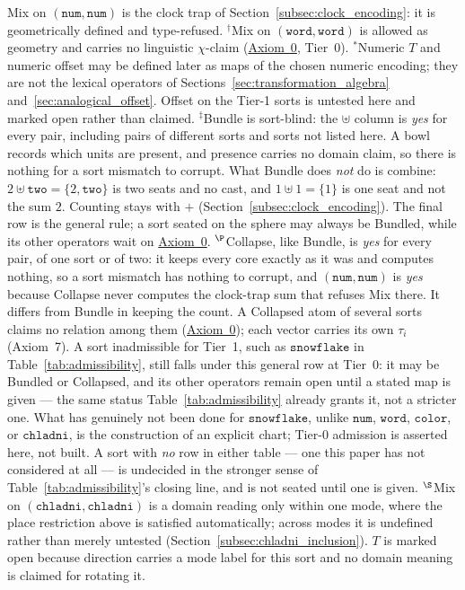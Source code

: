 \documentclass[12pt, a4paper]{article}
\begin{document}
\begin{table}[h]
{Mix on $(\mathtt{num},\mathtt{num})$ is the clock trap of
Section~\ref{subsec:clock_encoding}: it is geometrically defined and
type-refused. $^{\dagger}$Mix on $(\mathtt{word},\mathtt{word})$ is
allowed as geometry and carries no linguistic $\chi$-claim
(\hyperref[subsec:axiom0_admissibility]{Axiom~0}, Tier~0).
$^{*}$Numeric $T$ and numeric offset may be defined later as
maps of the chosen numeric encoding; they are not the lexical
operators of Sections~\ref{sec:transformation_algebra}
and~\ref{sec:analogical_offset}. Offset on the Tier-1 sorts is
untested here and marked open rather than claimed.
$^{\ddagger}$Bundle is sort-blind: the $\uplus$ column is \emph{yes}
for every pair, including pairs of different sorts and sorts not
listed here. A bowl records which units are present, and presence
carries no domain claim, so there is nothing for a sort mismatch to
corrupt. What Bundle does \emph{not} do is combine: $2\uplus
\texttt{two}=\{2,\texttt{two}\}$ is two seats and no cast, and
$1\uplus 1=\{1\}$ is one seat and not the sum $2$. Counting stays with
$+$ (Section~\ref{subsec:clock_encoding}). The final row is the
general rule; a sort seated on the sphere may always be Bundled, while
its other operators wait on
\hyperref[subsec:axiom0_admissibility]{Axiom~0}.
$^{\P}$Collapse, like Bundle, is \emph{yes} for every pair, of one sort or of two: it keeps every core exactly as it was and computes nothing, so a sort mismatch has nothing to corrupt, and $(\mathtt{num},\mathtt{num})$ is \emph{yes} because Collapse never computes the clock-trap sum that refuses Mix there. It differs from Bundle in keeping the count. A Collapsed atom of several sorts claims no relation among them (\hyperref[subsec:axiom0_admissibility]{Axiom~0}); each vector carries its own $\tau_i$ (Axiom~7). A sort inadmissible for
Tier~1, such as $\mathtt{snowflake}$ in
Table~\ref{tab:admissibility}, still falls under this general row at
Tier~0: it may be Bundled or Collapsed, and its other operators remain open until
a stated map is given --- the same status Table~\ref{tab:admissibility}
already grants it, not a stricter one. What has genuinely not been
done for $\mathtt{snowflake}$, unlike $\mathtt{num}$, $\mathtt{word}$,
$\mathtt{color}$, or $\mathtt{chladni}$, is the construction of an
explicit chart; Tier-0 admission is asserted here, not built. A sort
with \emph{no} row in either table --- one this paper has not
considered at all --- is undecided in the stronger sense of
Table~\ref{tab:admissibility}'s closing line, and is not seated until
one is given.
$^{\S}$Mix on $(\mathtt{chladni},\mathtt{chladni})$ is a domain
reading only within one mode, where the place restriction above is
satisfied automatically; across modes it is undefined rather than
merely untested (Section~\ref{subsec:chladni_inclusion}). $T$ is
marked open because direction carries a mode label for this sort and
no domain meaning is claimed for rotating it.}
\label{tab:type_table}
\end{table}
\end{document}
